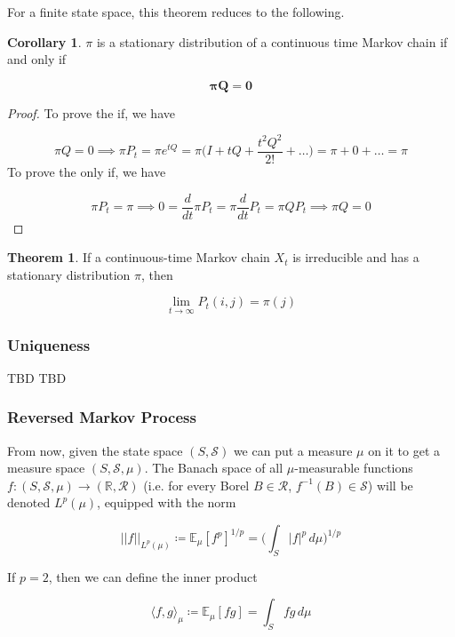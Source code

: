 \documentclass{article}
\theoremstyle{definition}
\newtheorem{theorem}{Theorem}[section]
\newtheorem{corollary}{Corollary}[theorem]
\theoremstyle{remark}
\theoremstyle{definition}
\begin{document}
    For a finite state space, this theorem reduces to the following. 

    \begin{corollary}
      $\pi$ is a stationary distribution of a continuous time Markov chain if and only if 

        \[\boldsymbol{\pi} \mathbf{Q} = \mathbf{0}\]
    \end{corollary}
    \begin{proof}
      To prove the if, we have 

        \[\pi Q = 0 \implies \pi P_t= \pi e^{t Q} = \pi \bigg(I + t Q + \frac{t^2 Q^2}{2!} + \ldots \bigg) = \pi + 0 + \ldots = \pi\]
      To prove the only if, we have 

        \[\pi P_t = \pi \implies 0 = \frac{d}{dt} \pi P_t = \pi \frac{d}{dt} P_t = \pi Q P_t \implies \pi Q = 0\]
    \end{proof}

    \begin{theorem}
      If a continuous-time Markov chain $X_t$ is irreducible and has a stationary distribution $\pi$, then 

        \[\lim_{t \rightarrow \infty} P_t (i, j) = \pi(j)\]
    \end{theorem}

    \subsubsection{Uniqueness} 

      TBD
      TBD

    \subsubsection{Reversed Markov Process}

      From now, given the state space $(S, \mathcal{S})$ we can put a measure $\mu$ on it to get a measure space $(S, \mathcal{S}, \mu)$. The Banach space of all $\mu$-measurable functions $f: (S, \mathcal{S}, \mu) \rightarrow (\mathbb{R}, \mathcal{R})$ (i.e. for every Borel $B \in \mathcal{R}$, $f^{-1}(B) \in \mathcal{S}$) will be denoted $L^p (\mu)$, equipped with the norm 

        \[||f||_{L^p(\mu)} \coloneqq \mathbb{E}_\mu [f^p]^{1/p} = \bigg( \int_S |f|^p \,d\mu \bigg)^{1/p}\]

      If $p = 2$, then we can define the inner product 

        \[\langle f, g \rangle_\mu \coloneqq \mathbb{E}_\mu [f g] = \int_S f g \, d\mu\]
\end{document}
